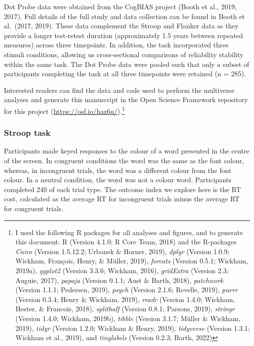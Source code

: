 \documentclass[
  man,floatsintext]{apa6}
\begin{document}
Dot Probe data were obtained from the CogBIAS project (Booth et al., 2019, 2017). Full details of the full study and data collection can be found in Booth et al.~(2017, 2019). These data complement the Stroop and Flanker data as they provide a longer test-retest duration (approximately 1.5 years between repeated measures) across three timepoints. In addition, the task incorporated three stimuli conditions, allowing us cross-sectional comparisons of reliability stability within the same task. The Dot Probe data were pooled such that only a subset of participants completing the task at all three timepoints were retained (n = 285).

Interested readers can find the data and code used to perform the multiverse analyses and generate this manuscript in the Open Science Framework repository for this project (\url{https://osf.io/haz6u/}).\footnote{I used the following R packages for all analyses and figures, and to generate this document: R (Version 4.1.0; R Core Team, 2018) and the R-packages \emph{Cairo} (Version 1.5.12.2; Urbanek \& Horner, 2019), \emph{dplyr} (Version 1.0.9; Wickham, François, Henry, \& Müller, 2019), \emph{forcats} (Version 0.5.1; Wickham, 2019a), \emph{ggplot2} (Version 3.3.6; Wickham, 2016), \emph{gridExtra} (Version 2.3; Auguie, 2017), \emph{papaja} (Version 0.1.1; Aust \& Barth, 2018), \emph{patchwork} (Version 1.1.1; Pedersen, 2019), \emph{psych} (Version 2.1.6; Revelle, 2019), \emph{purrr} (Version 0.3.4; Henry \& Wickham, 2019), \emph{readr} (Version 1.4.0; Wickham, Hester, \& Francois, 2018), \emph{splithalf} (Version 0.8.1; Parsons, 2019), \emph{stringr} (Version 1.4.0; Wickham, 2019b), \emph{tibble} (Version 3.1.7; Müller \& Wickham, 2019), \emph{tidyr} (Version 1.2.0; Wickham \& Henry, 2019), \emph{tidyverse} (Version 1.3.1; Wickham et al., 2019), and \emph{tinylabels} (Version 0.2.3; Barth, 2022)}

\hypertarget{stroop-task}{%
\subsubsection{Stroop task}\label{stroop-task}}

Participants made keyed responses to the colour of a word presented in the centre of the screen. In congruent conditions the word was the same as the font colour, whereas, in incongruent trials, the word was a different colour from the font colour. In a neutral condition, the word was not a colour word. Participants completed 240 of each trial type. The outcome index we explore here is the RT cost, calculated as the average RT for incongruent trials minus the average RT for congruent trials.
\end{document}
